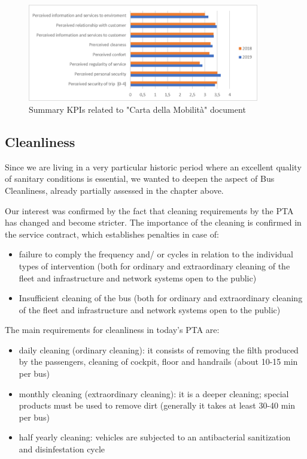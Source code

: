 \begin{figure}[h!]
    \centering
    \includegraphics[width=0.9\textwidth]{Images/Social_sustainability/graph.png}
    \caption{Summary KPIs related to "Carta della Mobilità" document}
    \label{fig:kpiscdm}
\end{figure}

\subsection{Cleanliness}
Since we are living in a very particular historic period where an excellent quality of sanitary conditions is essential, we wanted to deepen the aspect of Bus Cleanliness, already partially assessed in the chapter above.

Our interest was confirmed by the fact that cleaning requirements by the PTA has changed and become stricter. The importance of the cleaning is confirmed in the service contract, which establishes penalties in case of:
\begin{itemize}
    \item failure to comply the frequency and/ or cycles in relation to the individual types of intervention (both for ordinary and extraordinary cleaning of the fleet and infrastructure and network systems open to the public)
    \item Insufficient cleaning of the bus (both for ordinary and extraordinary cleaning of the fleet and infrastructure and network systems open to the public)
\end{itemize}

The main requirements for cleanliness in today's PTA are:

\begin{itemize}
    \item daily cleaning (ordinary cleaning): it consists of removing the filth produced by the passengers, cleaning of cockpit, floor and handrails (about 10-15 min per bus)
    \item monthly cleaning (extraordinary cleaning): it is a deeper cleaning; special products must be used to remove dirt (generally it takes at least 30-40 min per bus)
    \item half yearly cleaning: vehicles are subjected to an antibacterial sanitization and disinfestation cycle 
\end{itemize}

